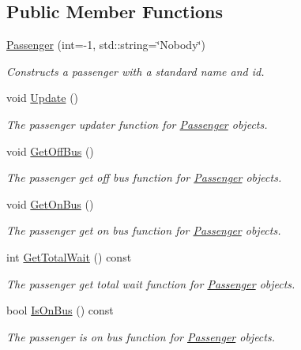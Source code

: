 \subsection*{Public Member Functions}
\begin{DoxyCompactItemize}
\item 
\hyperlink{classPassenger_a5c3addb9a6fd03e5e5642ed844e2702c}{Passenger} (int=-\/1, std\+::string=\char`\"{}Nobody\char`\"{})
\begin{DoxyCompactList}\small\item\em Constructs a passenger with a standard name and id. \end{DoxyCompactList}\item 
void \hyperlink{classPassenger_a960de3b29fc17a2c2d79c0b79d5cf299}{Update} ()
\begin{DoxyCompactList}\small\item\em The passenger updater function for \hyperlink{classPassenger}{Passenger} objects. \end{DoxyCompactList}\item 
void \hyperlink{classPassenger_a3cabb05dbf0c185e123f8d03368ed4f1}{Get\+Off\+Bus} ()
\begin{DoxyCompactList}\small\item\em The passenger get off bus function for \hyperlink{classPassenger}{Passenger} objects. \end{DoxyCompactList}\item 
void \hyperlink{classPassenger_ae2ba639cfef39781ac079778578bd9fe}{Get\+On\+Bus} ()
\begin{DoxyCompactList}\small\item\em The passenger get on bus function for \hyperlink{classPassenger}{Passenger} objects. \end{DoxyCompactList}\item 
int \hyperlink{classPassenger_a25158560f790ef7ef06d94c414b34f25}{Get\+Total\+Wait} () const
\begin{DoxyCompactList}\small\item\em The passenger get total wait function for \hyperlink{classPassenger}{Passenger} objects. \end{DoxyCompactList}\item 
bool \hyperlink{classPassenger_a2acf008ec444afcc859b914ee24add0e}{Is\+On\+Bus} () const
\begin{DoxyCompactList}\small\item\em The passenger is on bus function for \hyperlink{classPassenger}{Passenger} objects. \end{DoxyCompactList}\item 

\end{DoxyCompactItemize}
